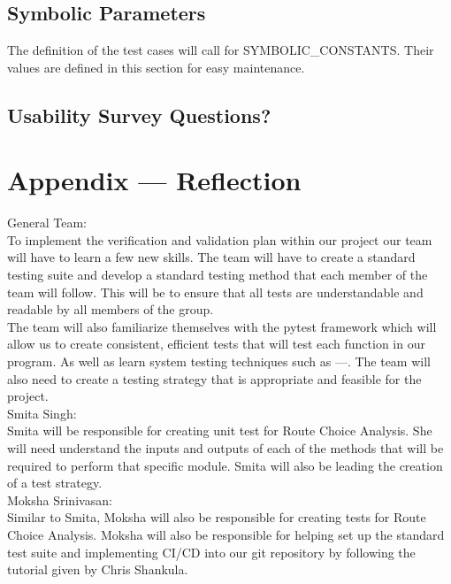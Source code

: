 \documentclass[12pt, titlepage]{article}
\begin{document}
\subsection{Symbolic Parameters}

The definition of the test cases will call for SYMBOLIC\_CONSTANTS.
Their values are defined in this section for easy maintenance.

\subsection{Usability Survey Questions?}


\newpage{}
\section*{Appendix --- Reflection}
General Team:\\

\noindent To implement the verification and validation plan within our project our team will have to learn a few new skills. The team will have to create a standard testing suite and develop a standard testing method that each member of the team will follow. This will be to ensure that all tests are understandable and readable by all members of the group. \\

\noindent The team will also familiarize themselves with the pytest framework which will allow us to create consistent, efficient tests that will test each function in our program. As well as learn system testing techniques such as ---.  The team will also need to create a testing strategy that is appropriate and feasible for the project.\\

\noindent Smita Singh:\\ Smita will be responsible for creating unit test for Route Choice Analysis. She will need understand the inputs and outputs of each of the methods that will be required to perform that specific module. Smita will also be leading the creation of a test strategy. \\

\noindent Moksha Srinivasan:\\ Similar to Smita, Moksha will also be responsible for creating tests for Route Choice Analysis. Moksha will also be responsible for helping set up the standard test suite and implementing CI/CD into our git repository by following the tutorial given by Chris Shankula. \\
\end{document}
